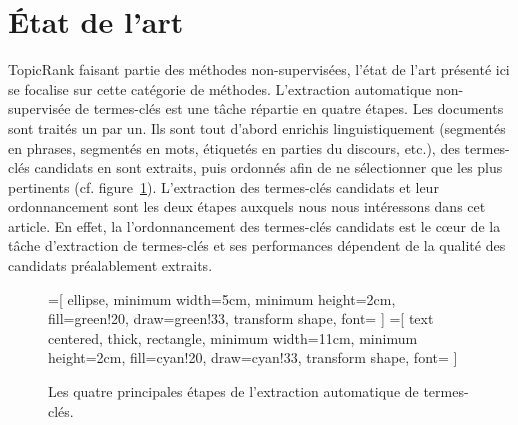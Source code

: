 \section{État de l'art}
\label{sec:etat_de_l_art}
  TopicRank faisant partie des méthodes non-supervisées, l'état de l'art
  présenté ici se focalise sur cette catégorie de méthodes.
  L'extraction automatique non-supervisée de termes-clés est une tâche répartie
  en quatre étapes. Les documents sont traités un par un. Ils sont tout d'abord
  enrichis linguistiquement (segmentés en phrases, segmentés en mots, étiquetés
  en parties du discours, etc.), des termes-clés candidats en sont extraits,
  puis ordonnés afin de ne sélectionner que les plus pertinents (cf.
  figure~\ref{fig:etapes_de_l_extraction_de_termes_cles}). L'extraction des
  termes-clés candidats et leur ordonnancement sont les deux étapes auxquels
  nous nous intéressons dans cet article. En effet, la l'ordonnancement des
  termes-clés candidats est le c\oe{}ur de la tâche d'extraction de termes-clés
  et ses performances dépendent de la qualité des candidats préalablement
  extraits.
  \begin{figure}
    =[
      ellipse,
      minimum width=5cm,
      minimum height=2cm,
      fill=green!20,
      draw=green!33,
      transform shape,
      font={\huge}
    ]
    =[
      text centered,
      thick,
      rectangle,
      minimum width=11cm,
      minimum height=2cm,
      fill=cyan!20,
      draw=cyan!33,
      transform shape,
      font={\huge\bfseries}
    ]

    \centering
    \caption{Les quatre principales étapes de l'extraction automatique de
             termes-clés. \label{fig:etapes_de_l_extraction_de_termes_cles}}
  \end{figure}

